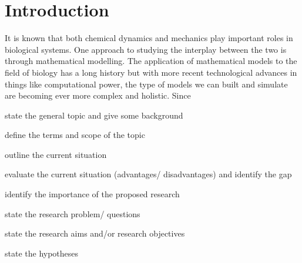 \chapter{Introduction}

It is known that both chemical dynamics and mechanics play important roles in biological systems. One approach to studying the interplay between the two is through mathematical modelling. The application of mathematical models to the field of biology has a long history but with more recent technological advances in things like computational power, the type of models we can built and simulate are becoming ever more complex and holistic. Since 







    state the general topic and give some background
    
    define the terms and scope of the topic
    
    outline the current situation
    
    evaluate the current situation (advantages/ disadvantages) and identify the gap
    
    identify the importance of the proposed research
    
    state the research problem/ questions
    
    state the research aims and/or research objectives
    
    state the hypotheses
